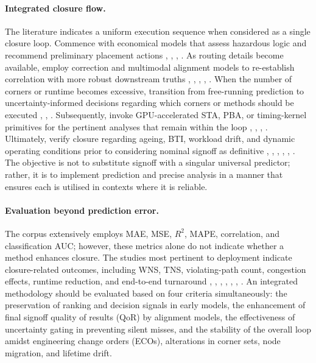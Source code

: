 \documentclass[num-refs]{wiley-article}
\begin{document}
  \paragraph{Integrated closure flow.} The literature indicates a uniform execution sequence when considered as a single closure loop. Commence with economical models that assess hazardous logic and recommend preliminary placement actions \cite{ref27}, \cite{ref29}, \cite{ref1}, \cite{ref3}. As routing details become available, employ correction and multimodal alignment models to re-establish correlation with more robust downstream truths \cite{ref25}, \cite{ref13}, \cite{ref17}, \cite{ref8}, \cite{ref10}. When the number of corners or runtime becomes excessive, transition from free-running prediction to uncertainty-informed decisions regarding which corners or methods should be executed \cite{ref28}, \cite{ref16}, \cite{ref9}. Subsequently, invoke GPU-accelerated STA, PBA, or timing-kernel primitives for the pertinent analyses that remain within the loop \cite{ref21}, \cite{ref22}, \cite{ref11}, \cite{ref12}. Ultimately, verify closure regarding ageing, BTI, workload drift, and dynamic operating conditions prior to considering nominal signoff as definitive \cite{ref14}, \cite{ref15}, \cite{ref23}, \cite{ref26}, \cite{ref38}, \cite{ref44}. The objective is not to substitute signoff with a singular universal predictor; rather, it is to implement prediction and precise analysis in a manner that ensures each is utilised in contexts where it is reliable.


  \paragraph{Evaluation beyond prediction error.} The corpus extensively employs MAE, MSE, $R^2$, MAPE, correlation, and classification AUC; however, these metrics alone do not indicate whether a method enhances closure. The studies most pertinent to deployment indicate closure-related outcomes, including WNS, TNS, violating-path count, congestion effects, runtime reduction, and end-to-end turnaround \cite{ref1}, \cite{ref7}, \cite{ref10}, \cite{ref16}, \cite{ref17}, \cite{ref19}, \cite{ref22}. An integrated methodology should be evaluated based on four criteria simultaneously: the preservation of ranking and decision signals in early models, the enhancement of final signoff quality of results (QoR) by alignment models, the effectiveness of uncertainty gating in preventing silent misses, and the stability of the overall loop amidst engineering change orders (ECOs), alterations in corner sets, node migration, and lifetime drift.
\end{document}
